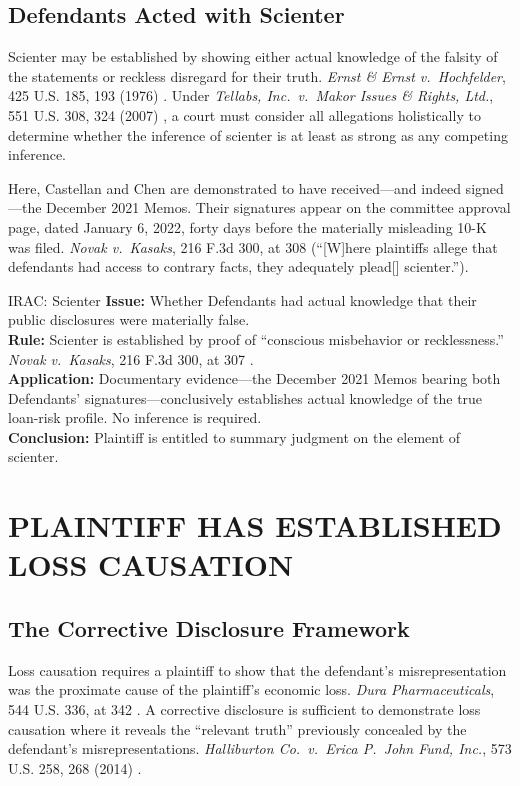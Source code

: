 \documentclass[12pt,letterpaper]{article}
\newcommand{\caseref}[5]{%
  \textit{#1}, #2 #3 #4 (#5)%
}
\newcommand{\caseshort}[3]{%
  \textit{#1}, #2, at #3%
}
\begin{document}
\subsection{Defendants Acted with Scienter}

Scienter may be established by showing either actual knowledge of the falsity of the statements or reckless disregard for their truth. \caseref{Ernst \& Ernst v.\ Hochfelder}{425}{U.S.}{185, 193}{1976}. Under \caseref{Tellabs, Inc.\ v.\ Makor Issues \& Rights, Ltd.}{551}{U.S.}{308, 324}{2007}, a court must consider all allegations holistically to determine whether the inference of scienter is at least as strong as any competing inference.

Here, Castellan and Chen are demonstrated to have received---and indeed signed---the December 2021 Memos. Their signatures appear on the committee approval page, dated January 6, 2022, forty days before the materially misleading 10-K was filed. \caseshort{Novak v.\ Kasaks}{216 F.3d 300}{308} (``[W]here plaintiffs allege that defendants had access to contrary facts, they adequately plead[] scienter.'').

\begin{iracblock}{IRAC: Scienter}
\textbf{Issue:} Whether Defendants had actual knowledge that their public disclosures were materially false.\\[4pt]
\textbf{Rule:} Scienter is established by proof of ``conscious misbehavior or recklessness.'' \caseshort{Novak v.\ Kasaks}{216 F.3d 300}{307}.\\[4pt]
\textbf{Application:} Documentary evidence---the December 2021 Memos bearing both Defendants' signatures---conclusively establishes actual knowledge of the true loan-risk profile. No inference is required.\\[4pt]
\textbf{Conclusion:} Plaintiff is entitled to summary judgment on the element of scienter.
\end{iracblock}

\section{PLAINTIFF HAS ESTABLISHED LOSS CAUSATION}

\subsection{The Corrective Disclosure Framework}

Loss causation requires a plaintiff to show that the defendant's misrepresentation was the proximate cause of the plaintiff's economic loss. \caseshort{Dura Pharmaceuticals}{544 U.S. 336}{342}. A corrective disclosure is sufficient to demonstrate loss causation where it reveals the ``relevant truth'' previously concealed by the defendant's misrepresentations. \caseref{Halliburton Co.\ v.\ Erica P.\ John Fund, Inc.}{573}{U.S.}{258, 268}{2014}.
\end{document}
